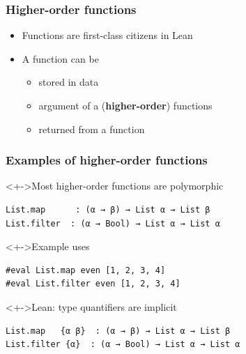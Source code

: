 \documentclass{beamer}
\subtitle{Higher-order functions}
\begin{document}
\begin{frame}
  \titlepage
\end{frame}
\begin{frame}[fragile]
  \frametitle{Higher-order functions}
  \begin{itemize}
  \item Functions are first-class citizens in Lean
  \item A function can be
    \begin{itemize}
    \item stored in data
    \item argument of a (\textbf{higher-order}) functions
    \item returned from a function
    \end{itemize}
  \end{itemize}
\end{frame}
\begin{frame}[fragile]
  \frametitle{Examples of higher-order functions}

  \begin{block}<+->{Most higher-order functions are polymorphic}
\begin{lstlisting}
List.map      : (α → β) → List α → List β 
List.filter  : (α → Bool) → List α → List α
\end{lstlisting}
  \end{block}
  \begin{block}<+->{Example uses}
\begin{lstlisting}
#eval List.map even [1, 2, 3, 4]
#eval List.filter even [1, 2, 3, 4]
\end{lstlisting}
  \end{block}
  \begin{alertblock}<+->{Lean: type quantifiers are implicit}
\begin{lstlisting}
List.map   {α β}  : (α → β) → List α → List β 
List.filter {α}  : (α → Bool) → List α → List α
\end{lstlisting}
  \end{alertblock}
\end{frame}
\end{document}
